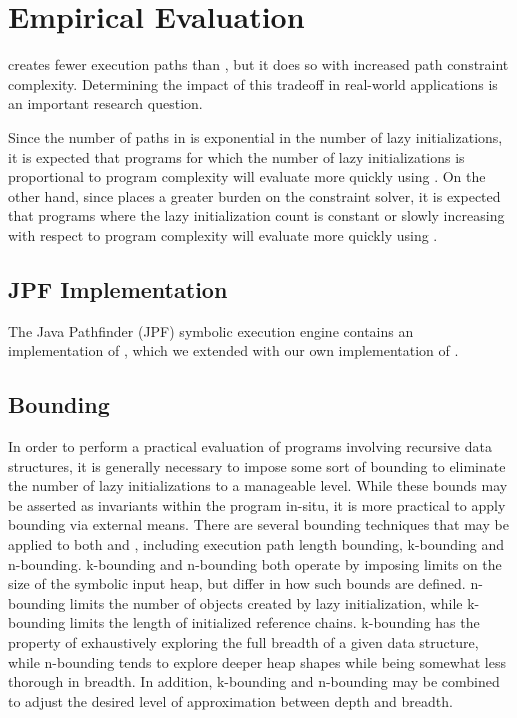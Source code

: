 \section{Empirical Evaluation}
\symtxt{} creates fewer execution paths than \gsetxt{}, but it does so with increased path constraint complexity. Determining the impact of this tradeoff in real-world applications is an important research question. 

Since the number of paths in \gsetxt{} is exponential in the number of lazy initializations, it is expected that programs for which the number of lazy initializations is proportional to program complexity will evaluate more quickly using \symtxt{}. On the other hand, since \symtxt{} places a greater burden on the constraint solver, it is expected that programs where the lazy initialization count is constant or slowly increasing with respect to program complexity will evaluate more quickly using \symtxt{}.

\subsection{JPF Implementation}
The Java Pathfinder (JPF) symbolic execution engine contains an implementation of \gsetxt{}, which we extended with our own implementation of \symtxt{}. 

\subsection{Bounding}
In order to perform a practical evaluation of programs involving recursive data structures, it is generally necessary to impose some sort of bounding to eliminate the number of lazy initializations to a manageable level. While these bounds may be asserted as invariants within the program in-situ, it is more practical to apply bounding via external means. There are several bounding techniques that may be applied to both \gsetxt{} and \symtxt{}, including execution path length bounding, k-bounding and n-bounding. k-bounding and n-bounding both operate by imposing limits on the size of the symbolic input heap, but differ in how such bounds are defined. n-bounding limits the number of objects created by lazy initialization, while k-bounding limits the length of initialized reference chains. k-bounding has the property of exhaustively exploring the full breadth of a given data structure, while n-bounding tends to explore deeper heap shapes while being somewhat less thorough in breadth. In addition, k-bounding and n-bounding may be combined to adjust the desired level of approximation between depth and breadth.

